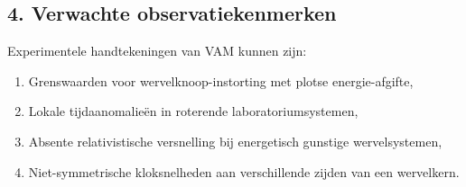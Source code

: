 \subsection{4. Verwachte observatiekenmerken}

Experimentele handtekeningen van VAM kunnen zijn:
\begin{enumerate}
    \item Grenswaarden voor wervelknoop-instorting met plotse energie-afgifte,
    \item Lokale tijdaanomalieën in roterende laboratoriumsystemen,
    \item Absente relativistische versnelling bij energetisch gunstige wervelsystemen,
    \item Niet-symmetrische kloksnelheden aan verschillende zijden van een wervelkern.
\end{enumerate}
